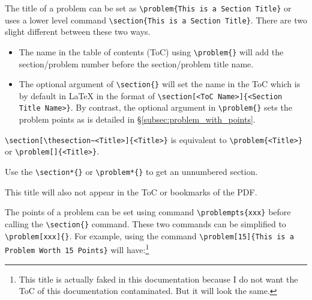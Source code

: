 \documentclass[twoside]{seu-ml-assign}
\begin{document}
      The title of a problem can be set as \verb|\problem{This is a Section Title}| or uses a lower level command \verb|\section{This is a Section Title}|.
      There are two slight different between these two ways.
      \begin{itemize}
        \item The name in the table of contents (ToC) using \verb|\problem{}| will add the section/problem number before the section/problem title name.
        \item The optional argument of \verb|\section{}| will set the name in the ToC which is by default in \LaTeX{} in the format of \verb|\section[<ToC Name>]{<Section Title Name>}|.
        By contrast, the optional argument in \verb|\problem{}| sets the problem points as is detailed in \S\ref{subsec:problem_with_points}.
      \end{itemize}
      \verb|\section[\thesection~<Title>]{<Title>}|
      is equivalent to
      \verb|\problem{<Title>}| or \verb|\problem[]{<Title>}|.
      
      

      Use the \verb|\section*{}| or \verb|\problem*{}| to get an unnumbered section.\vspace{-8mm}


      This title will also not appear in the ToC or bookmarks of the PDF.

    \label{subsec:problem_with_points}

      The points of a problem can be set using command \verb|\problempts{xxx}| before calling the \verb|\section{}| command.
      These two commands can be simplified to \verb|\problem[xxx]{}|.
      For example, using the command \verb|\problem[15]{This is a Problem Worth 15 Points}| will have:\footnote{This title is actually faked in this documentation because I do not want the ToC of this documentation contaminated. But it will look the same.}\vspace{-8mm}
\end{document}
